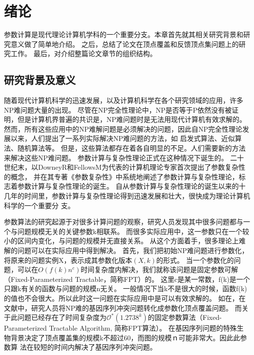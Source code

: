 ﻿\chapter{绪论}
参数计算是现代理论计算机学科的一个重要分支。本章首先就其相关研究背景和研究意义做了简单地介绍。
之后，总结了论文在顶点覆盖和反馈顶点集问题上的研究工作。
最后，对介绍整篇论文章节的组织结构。

\section{研究背景及意义}
随着现代计算机科学的迅速发展，以及计算机科学在各个研究领域的应用，许多NP难问题大量的出现。
尽管在NP完全性理论中，NP是否等于P依然没有被证明，但是计算机界普遍的共识是，NP难问题时是无法用现代计算机有效求解的。
然而，所有这些应用中的NP难解问题是必须解决的问题，因此自NP完全性理论发展以来，人们提出了一系列实际解决NP难问题的方法，如
启发式算法、近似算法、随机算法等。
但是，这些算法都存在着各自明显的不足。人们需要新的方法来解决这些NP难问题。
参数计算与复杂性理论正式在这种情况下诞生的。
二十世纪末，以DowneyR和FellowsM为代表的计算机理论专家首次提出了参数复杂性的概念，
并在其专著《参数复杂性》中系统地阐述了参数计算与复杂性理论，标志着参数计算与复杂性理论的诞生。
自从参数计算与复杂性理论的诞生以来的十几年的时间里，参数计算与复杂性理论得到迅速发展和壮大，很快成为理论计算机科学的一个重要分
支。

参数算法的研究起源于对很多计算问题的观察，研究人员发现其中很多问题都与一个与问题规模无关的关键参数k相联系。
而很多实际应用中，这一参数只在一个较小的区间内变化，与问题的规模并无直接关系。
从这个方面着手，很多理论上难解的问题可以在实际应用中得到解决。
首先，我们把初始NP难问题进行参数化，将原来的问题实例X，表示成其参数化版本$(X, k)$的形式。
当一个参数化的问题，可以在$O(f(k)n^c)$时间复杂度内解决，我们就称该问题是固定参数可解（Fixed-Parameterized Tractable，简称FPT）的。
这里c是某一常数，f(k)是一个只跟k有关的函数与问题的规模n无关。
一般情况下当k不是很大的时候，函数f(k)的值也不会很大。所以此时这一问题在实际应用中是可以有效求解的。
如在，在文献\cite{gonnet2000darwin}中，研究人员将NP难的基因序列冲突问题转化成参数化顶点覆盖问题。
而关于此问题已经存在了时间复杂度为$\mathcal{O}^*(1.2738^k)$的固定参数算法（Fixed-Parameterized Tractable Algorithm, 简称FPT算法）。
在基因序列问题的特殊生物背景决定了顶点覆盖集的规模k不超过60，而图的规模ｎ可能非常大。因此此参数算
法在较短的时间内解决了基因序列冲突问题。

